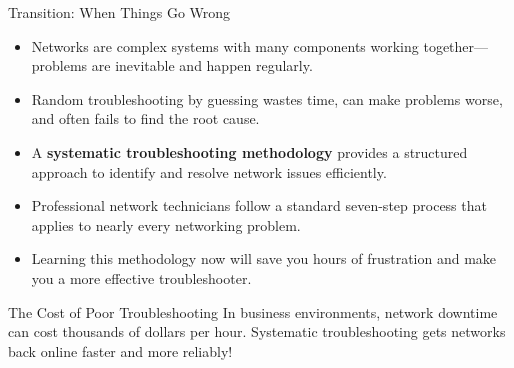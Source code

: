 \documentclass[aspectratio=169]{beamer}
\begin{document}
\begin{frame}{Transition: When Things Go Wrong}

\begin{itemize}
    \item Networks are complex systems with many components working together—problems are inevitable and happen regularly.
    \item Random troubleshooting by guessing wastes time, can make problems worse, and often fails to find the root cause.
    \item A \textbf{systematic troubleshooting methodology} provides a structured approach to identify and resolve network issues efficiently.
    \item Professional network technicians follow a standard seven-step process that applies to nearly every networking problem.
    \item Learning this methodology now will save you hours of frustration and make you a more effective troubleshooter.
\end{itemize}

\vspace{0.3cm}

\begin{alertblock}{The Cost of Poor Troubleshooting}
In business environments, network downtime can cost thousands of dollars per hour. Systematic troubleshooting gets networks back online faster and more reliably!
\end{alertblock}

\end{frame}
\end{document}
